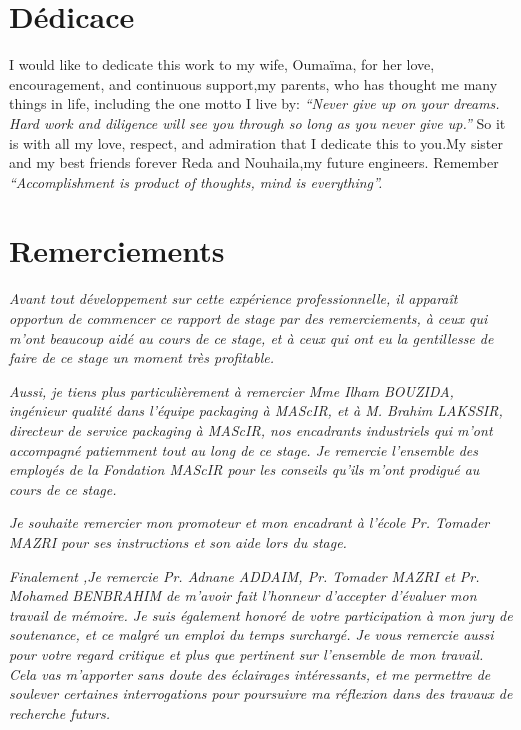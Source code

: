 \documentclass[11pt, a4paper, twoside]{book}
\author{Réalisé par : \\ Otmane BOUAYAD \vspace*{1truecm} \\ Encadré par : \\
Mme Ilham BOUZIDA : Encadrante professionnelle\\ 
Pr Tomader MAZRI : Encadrante académique\\
}
\date{(Du 15 Février au 30 Juin  2016)}
\begin{document}

\maketitle
\pagestyle{plain}
\frenchspacing
\chapter*{Dédicace}

I would like to dedicate this work to my wife, Oumaïma, for her love, encouragement, and continuous support,my parents, who has thought me many things in life, including the one motto I live by: 
\emph{“Never give up on your dreams. Hard work and diligence will see you through so long as you never give up.”}
 So it is with all my love, respect, and admiration that I dedicate this to you.My sister and my best friends forever Reda and Nouhaila,my future engineers. Remember
\emph{“Accomplishment is product of thoughts, mind is everything”.}

\chapter*{Remerciements}
\emph{
Avant tout développement sur cette expérience professionnelle, il apparaît opportun 
de commencer ce rapport de stage par des remerciements, à ceux qui  m'ont beaucoup 
aidé au cours de ce stage, et à ceux qui ont eu la gentillesse de faire de ce stage un 
moment très profitable.\\}

\emph{
Aussi, je tiens plus particulièrement à remercier Mme Ilham
BOUZIDA, ingénieur qualité dans l’équipe packaging à MAScIR, et à M. Brahim LAKSSIR, directeur de service packaging à MAScIR, nos encadrants industriels qui  m'ont accompagné patiemment tout au long de ce stage. Je remercie l'ensemble des employés de la Fondation MAScIR pour les conseils qu’ils m'ont prodigué au cours de ce stage.\\}

\emph{Je souhaite remercier mon promoteur et mon encadrant à l'école Pr. Tomader MAZRI pour ses instructions et son aide lors du stage.\\}

\emph{Finalement ,Je remercie Pr. Adnane ADDAIM, Pr. Tomader MAZRI et Pr. Mohamed BENBRAHIM de m’avoir fait l’honneur d’accepter d’évaluer mon travail de mémoire. Je suis également honoré de votre participation à mon jury de soutenance, et ce malgré un emploi du temps surchargé. Je vous remercie aussi pour votre regard critique et plus que pertinent sur l’ensemble de mon travail. Cela vas m'apporter sans doute des éclairages intéressants, et me permettre de soulever certaines interrogations pour poursuivre ma réflexion dans des travaux de recherche futurs. \\ }
\end{document}

